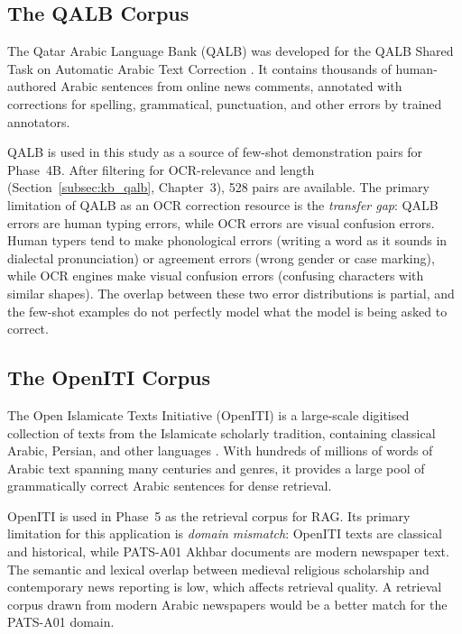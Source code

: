 \subsection{The QALB Corpus}
\label{subsec:ks_qalb}

The Qatar Arabic Language Bank (QALB) was developed for the QALB Shared Task
on Automatic Arabic Text Correction \cite{mohit2014first,zaghouani2014large}.
It contains thousands of human-authored Arabic sentences from online news
comments, annotated with corrections for spelling, grammatical, punctuation,
and other errors by trained annotators.

QALB is used in this study as a source of few-shot demonstration pairs for
Phase~4B.
After filtering for OCR-relevance and length (Section~\ref{subsec:kb_qalb},
Chapter~3), 528 pairs are available.
The primary limitation of QALB as an OCR correction resource is the
\emph{transfer gap}: QALB errors are human typing errors, while OCR errors are
visual confusion errors.
Human typers tend to make phonological errors (writing a word as it sounds in
dialectal pronunciation) or agreement errors (wrong gender or case marking),
while OCR engines make visual confusion errors (confusing characters with similar
shapes).
The overlap between these two error distributions is partial, and the few-shot
examples do not perfectly model what the model is being asked to correct.

\subsection{The OpenITI Corpus}
\label{subsec:ks_openiti}

The Open Islamicate Texts Initiative (OpenITI) is a large-scale digitised
collection of texts from the Islamicate scholarly tradition, containing classical
Arabic, Persian, and other languages \cite{nigst2020openiti,romanov2017openiti}.
With hundreds of millions of words of Arabic text spanning many centuries and
genres, it provides a large pool of grammatically correct Arabic sentences for
dense retrieval.

OpenITI is used in Phase~5 as the retrieval corpus for RAG.
Its primary limitation for this application is \emph{domain mismatch}: OpenITI
texts are classical and historical, while PATS-A01 Akhbar documents are modern
newspaper text.
The semantic and lexical overlap between medieval religious scholarship and
contemporary news reporting is low, which affects retrieval quality.
A retrieval corpus drawn from modern Arabic newspapers would be a better match
for the PATS-A01 domain.

